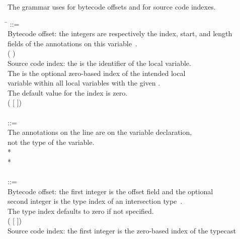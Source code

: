 \documentclass{article}
\begin{document}
The grammar uses \bnflit{\#} for bytecode offsets and \bnflit{*} for source code indexes.

\begin{tabbing}
\qquad \= \kill
{} ::= \\
\qquad    \bnfcmt Bytecode offset: the integers are respectively the index, start, and length \\
\qquad    \bnfcmt fields of the annotations on this variable~\cite{JSR308-webpage-201110}. \\
\qquad    ( \bnflit{\#}  \bnflit{+} ) \\
\qquad    \bnfcmt Source code index: the  is the identifier of the local variable. \\
\qquad    \bnfcmt The  is the optional zero-based index of the intended local \\
\qquad    \bnfcmt variable within all local variables with the given . \\
\qquad    \bnfcmt The default value for the index is zero. \\
\qquad    \bnfor{} ( [\bnflit{*} ]) \\
\\
 ::= \\
\qquad    \bnfcmt The annotations on the  line are on the variable declaration, \\
\qquad    \bnfcmt not the type of the variable. \\
\qquad    {}  \bnflit{:} * \lineend \\
\qquad    {}* \\
\\
 ::= \\
\qquad    \bnfcmt Bytecode offset: the first integer is the offset field and the optional \\
\qquad    \bnfcmt second integer is the type index of an intersection type~\cite{JSR308-webpage-201110}. \\
\qquad    \bnfcmt The type index defaults to zero if not specified. \\
\qquad    (\bnflit{\#}  [ \bnflit{,}  ]) \\
\qquad    \bnfcmt Source code index: the first integer is the zero-based index of the typecast \\

\end{tabbing}
\end{document}
